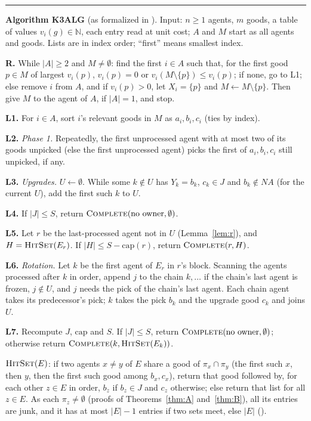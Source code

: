 \documentclass[runningheads,11pt]{llncs}
\newcommand{\NA}{\mathit{NA}}
\newcommand{\capa}{\mathrm{cap}}
\begin{document}
\medskip
\noindent\rule{\textwidth}{0.5pt}\par
\noindent\textbf{Algorithm K3ALG} (as formalized in ). Input: $n\ge1$ agents, $m$ goods, a table of values $v_i(g)\in\mathbb{N}$, each entry read at unit cost; $A$ and $M$ start as all agents and goods. Lists are in index order; ``first'' means smallest index.
\par\noindent\textbf{R.} While $|A|\ge2$ and $M\ne\emptyset$: find the first $i\in A$ such that, for the first good $p\in M$ of largest $v_i(p)$, $v_i(p)=0$ or $v_i(M\setminus\{p\})\le v_i(p)$; if none, go to L1; else remove $i$ from $A$, and if $v_i(p)>0$, let $X_i=\{p\}$ and $M\leftarrow M\setminus\{p\}$. Then give $M$ to the agent of $A$, if $|A|=1$, and stop.
\par\noindent\textbf{L1.} For $i\in A$, sort $i$'s relevant goods in $M$ as $a_i,b_i,c_i$ (ties by index).
\par\noindent\textbf{L2.} \emph{Phase 1.} Repeatedly, the first unprocessed agent with at most two of its goods unpicked (else the first unprocessed agent) picks the first of $a_i,b_i,c_i$ still unpicked, if any.
\par\noindent\textbf{L3.} \emph{Upgrades.} $U\leftarrow\emptyset$. While some $k\notin U$ has $Y_k=b_k$, $c_k\in J$ and $b_k\notin\NA$ (for the current $U$), add the first such $k$ to $U$.
\par\noindent\textbf{L4.} If $|J|\le S$, return $\textsc{Complete}(\text{no owner},\emptyset)$.
\par\noindent\textbf{L5.} Let $r$ be the last-processed agent not in $U$ (Lemma~\ref{lem:r}), and $H=\textsc{HitSet}(E_r)$. If $|H|\le S-\capa(r)$, return $\textsc{Complete}(r,H)$.
\par\noindent\textbf{L6.} \emph{Rotation.} Let $k$ be the first agent of $E_r$ in $r$'s block. Scanning the agents processed after $k$ in order, append $j$ to the chain $k,\dots$ if the chain's last agent is frozen, $j\notin U$, and $j$ needs the pick of the chain's last agent. Each chain agent takes its predecessor's pick; $k$ takes the pick $b_k$ and the upgrade good $c_k$ and joins $U$.
\par\noindent\textbf{L7.} Recompute $J$, $\capa$ and $S$. If $|J|\le S$, return $\textsc{Complete}(\text{no owner},\emptyset)$; otherwise return $\textsc{Complete}(k,\textsc{HitSet}(E_k))$.\par
\noindent
$\textsc{HitSet}(E)$: if two agents $x\ne y$ of $E$ share a good of $\pi_x\cap\pi_y$ (the first such $x$, then $y$, then the first such good among $b_x,c_x$), return that good followed by, for each other $z\in E$ in order, $b_z$ if $b_z\in J$ and $c_z$ otherwise; else return that list for all $z\in E$. As each $\pi_z\ne\emptyset$ (proofs of Theorems~\ref{thm:A} and~\ref{thm:B}), all its entries are junk, and it has at most $|E|-1$ entries if two sets meet, else $|E|$ ().
\end{document}

